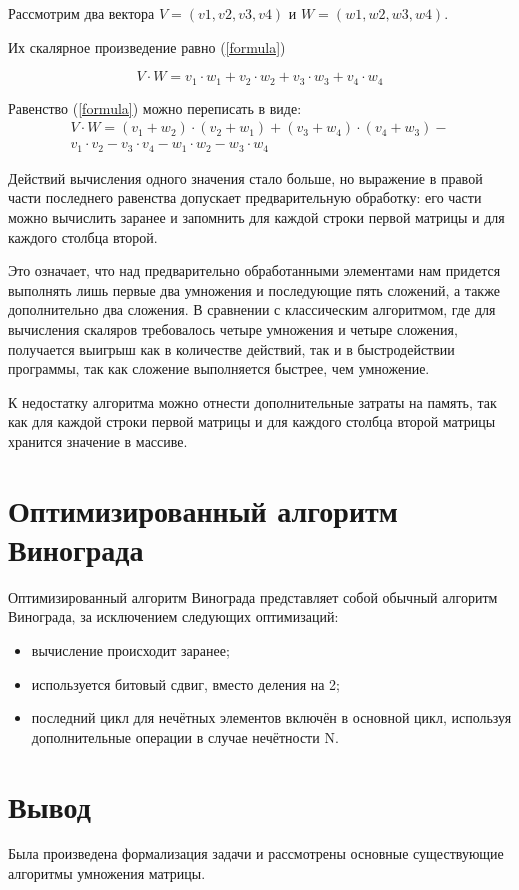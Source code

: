 Рассмотрим два вектора $V = (v1, v2, v3, v4)$ и $W = (w1, w2, w3, w4)$.  

Их скалярное произведение равно (\ref{formula}) 

\begin{equation} 
	V \cdot W=v_1 \cdot w_1 + v_2 \cdot w_2 + v_3 \cdot w_3 + v_4 \cdot w_4
	\label{formula}
\end{equation}

Равенство (\ref{formula}) можно переписать в виде:
\begin{align*} 
	V \cdot W=(v_1 + w_2) \cdot (v_2 + w_1) + (v_3 + w_4) \cdot (v_4 + w_3) - \\
	v_1 \cdot v_2 - v_3 \cdot v_4 - w_1 \cdot w_2 - w_3 \cdot w_4
	\label{formula2}
\end{align*}

Действий вычисления одного значения стало больше, но выражение в правой части последнего равенства допускает предварительную обработку:
его части можно вычислить заранее и запомнить для каждой строки первой матрицы и для каждого столбца второй.

Это означает, что над предварительно обработанными элементами нам придется выполнять лишь первые два умножения и последующие пять сложений, а также дополнительно два сложения. В сравнении с классическим алгоритмом, где для вычисления скаляров требовалось четыре умножения и четыре сложения, получается выигрыш как
в количестве действий, так и в быстродействии программы, так как сложение выполняется быстрее, чем умножение.

К недостатку алгоритма можно отнести дополнительные затраты на память, так как для каждой строки первой матрицы 
и для каждого столбца второй матрицы хранится значение в массиве.

\section{Оптимизированный алгоритм Винограда}
Оптимизированный алгоритм Винограда представляет собой обычный алгоритм Винограда, за исключением следующих оптимизаций:
\begin{itemize}
	\item вычисление происходит заранее;
	\item используется битовый сдвиг, вместо деления на 2;
	\item последний цикл для нечётных элементов включён в основной цикл, используя дополнительные операции в случае нечётности N.
\end{itemize}

\section*{Вывод}
Была произведена формализация задачи и рассмотрены основные существующие алгоритмы умножения матрицы.